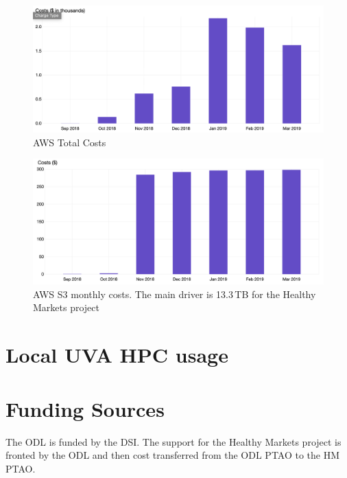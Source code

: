 \begin{figure}[!hbtp]
\includegraphics[width=\textwidth]{images/aws-metrics/throughmar/total.png}
\caption{AWS Total Costs\label{fg:awstotal}}
\end{figure}
\begin{figure}[!hbtp]
\includegraphics[width=\textwidth]{images/aws-metrics/throughmar/s3.png}
\caption{AWS S3 monthly costs. The main driver is 13.3\,TB for the Healthy Markets project\label{fg:awss3}}
\end{figure}


\section{Local UVA HPC usage}

\section{Funding Sources}
The ODL is funded by the DSI. The support for the Healthy Markets project is fronted by the ODL and then  cost transferred from the ODL PTAO to the HM PTAO.

